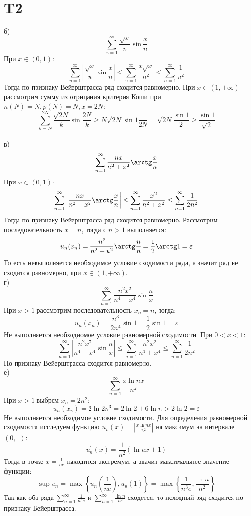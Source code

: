 \documentclass[12pt]{article}
\begin{document}
\section{T2}
б) 
\[
    \sum_{n=1}^{\infty} \frac{\sqrt{x} }{n}\sin \frac{x}{n} 
\]
При $x \in (0, 1)$: 
\[
    \sum_{n=1}^{\infty} \left\vert \frac{\sqrt{x} }{n}\sin \frac{x}{n} \right\vert  \leq \sum_{n=1}^{\infty} \frac{x \sqrt{x}}{n^2} \leq \sum_{n=1}^{\infty} \frac{1}{n^2}  
\] 
Тогда по признаку Вейерштрасса ряд сходится равномерно. 
При $x \in (1, +\infty)$ рассмотрим сумму из отрицания критерия Коши при $n(N) = N, p(N) = N, x = 2N$:
\[
    \sum_{k=N}^{2N} \frac{\sqrt{2N}}{k} \sin \frac{2N}{k} \geq N \sqrt{2N} \sin 1 \frac{1}{2N} = \sqrt{2N} \frac{\sin 1}{2} \geq \frac{\sin 1}{\sqrt{2} }    
\]
\\ в)
\[
    \sum_{n=1}^{\infty} \frac{nx}{n^2 + x^2} \arctg \frac{x}{n}
\]
При $x \in (0, 1)$: 
\[
    \sum_{n=1}^{\infty} \left\vert \frac{nx}{n^2 + x^2} \arctg \frac{x}{n} \right\vert  \leq \sum_{n=1}^{\infty} \frac{x^2}{n^2 + x^2} \leq \sum_{n=1}^{\infty} \frac{1}{2n^2} 
\] 
Тогда по признаку Вейерштрасса ряд сходится равномерно. 
Рассмотрим последовательность $x = n$, тогда с $n > 1$ выполняется:
\[
    u_n(x_n) = \frac{n^2}{n^2 + n^2} \arctg \frac{n}{n} = \frac{1}{2} \arctg 1 = \varepsilon
\]  
То есть невыполняется необходимое условие сходимости ряда, а значит ряд не сходится равномерно, при $x \in (1, +\infty)$. 
\\ г) 
\[
    \sum_{n=1}^{\infty} \frac{n^2 x^2}{n^4 + x^4} \sin \frac{n}{x}
\]
При $x > 1$ рассмотрим последовательность $x_n = n$, тогда:
\[
    u_n(x_n) = \frac{n^3}{2 n^4} \sin 1 = \frac{1}{2} \sin 1 = \varepsilon 
\] 
Не выполняется необходиомое условие равномерной сходимости. 
При $0 < x < 1$: 
\[
    \sum_{n=1}^{\infty} \left\vert \frac{n^2 x^2}{n^4 + x^4} \sin \frac{n}{x} \right\vert \leq \sum_{n=1}^{\infty} \frac{n^2 x^2}{n^4 + x^4} \leq \sum_{n=1}^{\infty} \frac{1}{2n^2}
\]
По признаку Вейерштрасса сходится равномерно. 
\\ е) 
\[
    \sum_{n=1}^{\infty} \frac{x\ln nx}{n^2}
\]
При $x > 1$ выбрем $x_n = 2n^2$: 
\[
    u_n(x_n) = 2 \ln 2n^3 = 2\ln 2 + 6 \ln n > 2\ln 2 = \varepsilon 
\]  
Не выполняется необходимое условие сходимости. Для определения равномерной сходимости исследуем 
функцию $u_n(x) = \left\vert \frac{x\ln nx}{n^2} \right\vert $ на максимум на интервале $(0, 1)$: 
\[
    u_n^{\prime}(x) = \frac{1}{n^2}(\ln nx + 1)
\] 
Тогда в точке $x = \frac{1}{ne}$ находится экстремум, а значит 
максимальное значение функции: 
\[
    \sup u_n = \max \left\{ u_n(\frac{1}{ne}), u_n(1) \right\} = 
    \max \left\{ \frac{1}{n^3 e}, \frac{\ln n}{n^2} \right\} 
\]  
Так как оба ряда $\sum_{n=1}^{\infty} \frac{1}{n^3 e}$ и $\sum_{n=1}^{\infty} \frac{\ln n}{n^2}$ сходятся, то 
исходный ряд сходится по признаку Вейерштрасса.
\end{document}
